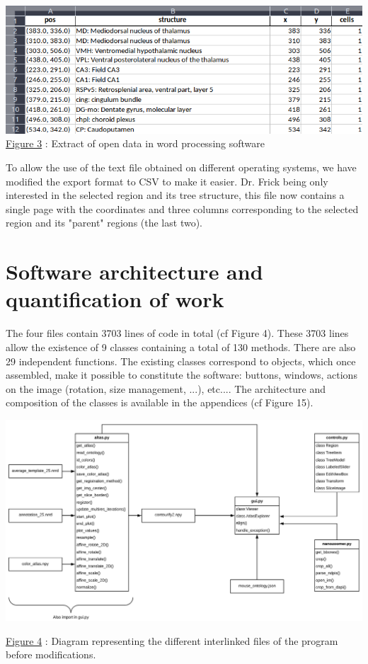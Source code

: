 \documentclass[a4paper,12pt]{report}
\begin{document}
\begin{center} \includegraphics[scale=0.55]{excelOutput.png}\\
\underline{Figure 3} : Extract of open data in word processing software \vspace{1\baselineskip}\\ \end{center}

To allow the use of the text file obtained on different operating systems, we have modified the export format to CSV to make it easier. Dr. Frick being only interested in the selected region and its tree structure, this file now contains a single page with the coordinates and three columns corresponding to the selected region and its "parent" regions (the last two).\\

\section{Software architecture and quantification of work}
The four files contain 3703 lines of code in total (cf Figure 4). These 3703 lines allow the existence of 9 classes containing a total of 130 methods. There are also 29 independent functions. The existing classes correspond to objects, which once assembled, make it possible to constitute the software: buttons, windows, actions on the image (rotation, size management, ...), etc.... The architecture and composition of the classes is available in the appendices (cf Figure 15).\\
\begin{center} \includegraphics[scale=0.37]{filesBefore.png}


\underline{Figure 4} : Diagram representing the different interlinked files of the program before modifications.\\ \vspace{1\baselineskip} \end{center}
\end{document}
